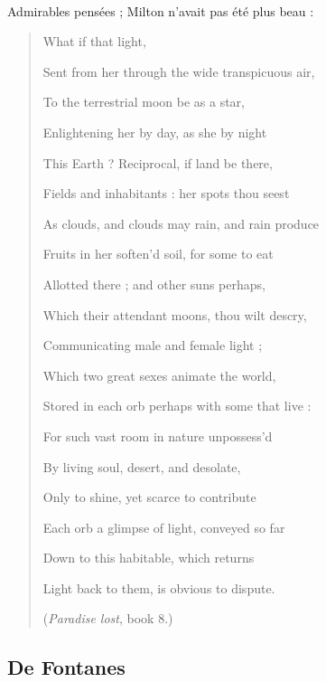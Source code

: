 \documentclass[a4paper, 11pt, oneside]{article}
\begin{document}
\paragraph{}
Admirables pensées ; Milton n'avait pas été plus beau :
\begin{quotation}
\normalsize
\hspace*{15mm}What if that light,

Sent from her through the wide transpicuous air,

To the terrestrial moon be as a star,

Enlightening her by day, as she by night

This Earth ? Reciprocal, if land be there,

Fields and inhabitants : her spots thou seest

As clouds, and clouds may rain, and rain produce

Fruits in her soften'd soil, for some to eat

Allotted there ; and other suns perhaps,

Which their attendant moons, thou wilt descry,

Communicating male and female light ;

Which two great sexes animate the world,

Stored in each orb perhaps with some that live :

For such vast room in nature unpossess'd

By living soul, desert, and desolate,

Only to shine, yet scarce to contribute

Each orb a glimpse of light, conveyed so far

Down to this habitable, which returns

Light back to them, is obvious to dispute.

\hspace*{5mm}(\emph{Paradise lost}, book 8.)
\end{quotation}
\clearpage
\subsection{De Fontanes}
\end{document}
